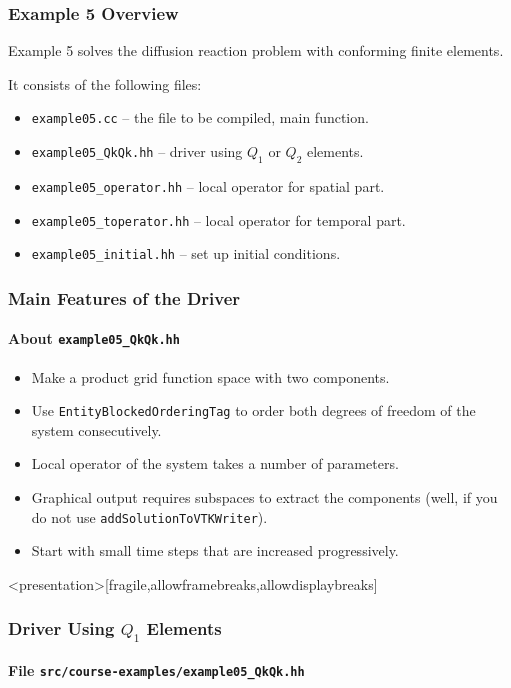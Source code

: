 \begin{frame}
\frametitle{Example 5 Overview}
Example 5 solves the diffusion reaction problem with conforming finite elements.

It consists of the following files:
\begin{itemize}
\item \lstinline{example05.cc} -- the file to be compiled, main function. 
\item \lstinline{example05_QkQk.hh} -- driver using $Q_1$ or $Q_2$ elements. 
\item \lstinline{example05_operator.hh} -- local operator for spatial part.
\item \lstinline{example05_toperator.hh} -- local operator for temporal part.
\item \lstinline{example05_initial.hh} -- set up initial conditions.
\end{itemize}
\end{frame}

\begin{frame}
\frametitle{Main Features of the Driver}
\framesubtitle{About \lstinline{example05_QkQk.hh}}
\begin{itemize}
\item Make a product grid function space with two components.
\item Use \lstinline{EntityBlockedOrderingTag} to order
both degrees of freedom of the system consecutively.
\item Local operator of the system takes a number of parameters.
\item Graphical output requires subspaces to extract the components (well, if
you do not use \lstinline{addSolutionToVTKWriter}).
\item Start with small time steps that are increased progressively.
\end{itemize}
\end{frame}

\begin{frame}<presentation>[fragile,allowframebreaks,allowdisplaybreaks]
\frametitle<presentation>{Driver Using $Q_1$ Elements}
\framesubtitle<presentation>{File \texttt{src/course-examples/example05\_QkQk.hh}}

\end{frame}

